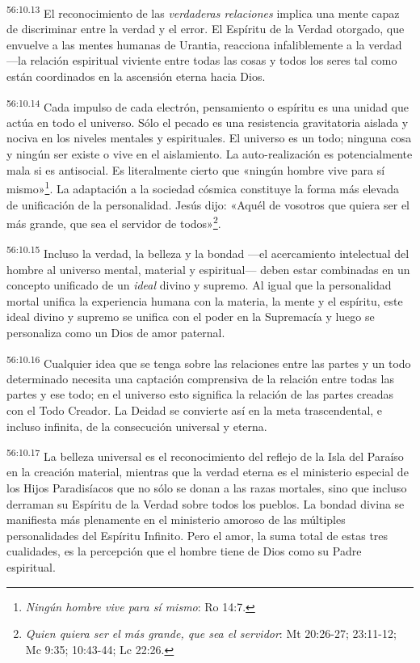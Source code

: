 \par
\textsuperscript{56:10.13} El reconocimiento de las \textit{verdaderas relaciones} implica una mente capaz de discriminar entre la verdad y el error. El Espíritu de la Verdad otorgado, que envuelve a las mentes humanas de Urantia, reacciona infaliblemente a la verdad ---la relación espiritual viviente entre todas las cosas y todos los seres tal como están coordinados en la ascensión eterna hacia Dios.

\par
\textsuperscript{56:10.14} Cada impulso de cada electrón, pensamiento o espíritu es una unidad que actúa en todo el universo. Sólo el pecado es una resistencia gravitatoria aislada y nociva en los niveles mentales y espirituales. El universo es un todo; ninguna cosa y ningún ser existe o vive en el aislamiento. La auto-realización es potencialmente mala si es antisocial. Es literalmente cierto que «ningún hombre vive para sí mismo»\footnote{\textit{Ningún hombre vive para sí mismo}: Ro 14:7.}. La adaptación a la sociedad cósmica constituye la forma más elevada de unificación de la personalidad. Jesús dijo: «Aquél de vosotros que quiera ser el más grande, que sea el servidor de todos»\footnote{\textit{Quien quiera ser el más grande, que sea el servidor}: Mt 20:26-27; 23:11-12; Mc 9:35; 10:43-44; Lc 22:26.}.

\par
\textsuperscript{56:10.15} Incluso la verdad, la belleza y la bondad ---el acercamiento intelectual del hombre al universo mental, material y espiritual--- deben estar combinadas en un concepto unificado de un \textit{ideal} divino y supremo. Al igual que la personalidad mortal unifica la experiencia humana con la materia, la mente y el espíritu, este ideal divino y supremo se unifica con el poder en la Supremacía y luego se personaliza como un Dios de amor paternal.

\par
\textsuperscript{56:10.16} Cualquier idea que se tenga sobre las relaciones entre las partes y un todo determinado necesita una captación comprensiva de la relación entre todas las partes y ese todo; en el universo esto significa la relación de las partes creadas con el Todo Creador. La Deidad se convierte así en la meta trascendental, e incluso infinita, de la consecución universal y eterna.

\par
\textsuperscript{56:10.17} La belleza universal es el reconocimiento del reflejo de la Isla del Paraíso en la creación material, mientras que la verdad eterna es el ministerio especial de los Hijos Paradisíacos que no sólo se donan a las razas mortales, sino que incluso derraman su Espíritu de la Verdad sobre todos los pueblos. La bondad divina se manifiesta más plenamente en el ministerio amoroso de las múltiples personalidades del Espíritu Infinito. Pero el amor, la suma total de estas tres cualidades, es la percepción que el hombre tiene de Dios como su Padre espiritual.

